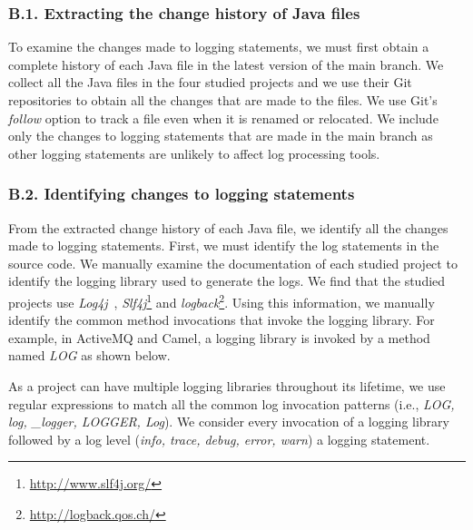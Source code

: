 \subsubsection*{B.1. Extracting the change history of Java files} 
To examine the changes made to logging statements, we must first obtain a complete history of each Java file in the latest version of the main branch.
We collect all the Java files in the four studied projects and we use their Git repositories to obtain all the changes that are made to the files. We use Git's \emph{follow} option to track a file even when it is renamed or relocated. We include only the changes to logging statements that are made in the main branch as other logging statements are unlikely to affect log processing tools. %

\subsubsection*{B.2. Identifying changes to logging statements}
From the extracted change history of each Java file, we identify all the changes made to logging statements.
First, we must identify the log statements in the source code. We manually examine the documentation of each studied project to identify the logging library used to generate the logs. %
We find that the studied projects use \textsl{Log4j}~\cite{EMSEIAN}, \emph{Slf4j}\footnote{\url{http://www.slf4j.org/}} and \emph{logback}\footnote{\url{http://logback.qos.ch/}}.
Using this information, we manually identify the common method invocations that invoke the logging library. For example, in ActiveMQ and Camel, a logging library is invoked by a method named \emph{LOG} as shown below.


As a project can have multiple logging libraries throughout its lifetime, we use regular expressions to match all the common log invocation patterns (i.e., \emph{LOG, log, \_logger, LOGGER, Log}). We consider every invocation of a logging library followed by a log level (\emph{info, trace, debug, error, warn}) a logging statement.


